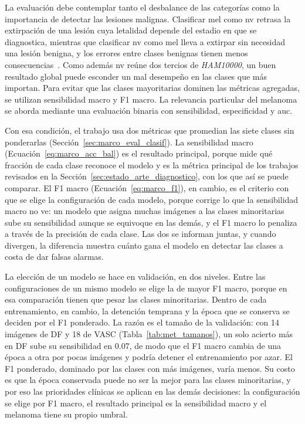 La evaluación debe contemplar tanto el desbalance de las categorías como la importancia de detectar las lesiones malignas. Clasificar \gls{mel} como \gls{nv} retrasa la extirpación de una lesión cuya letalidad depende del estadio en que se diagnostica, mientras que clasificar \gls{nv} como \gls{mel} lleva a extirpar sin necesidad una lesión benigna, y los errores entre clases benignas tienen menos consecuencias~\cite{tschandl2018ham10000,nci2026melanoma}. Como además \gls{nv} reúne dos tercios
de \emph{HAM10000}, un buen resultado global puede esconder un mal desempeño en las clases que más importan. Para evitar que las clases mayoritarias dominen las métricas agregadas, se utilizan sensibilidad macro y F1 macro. La relevancia particular del melanoma se aborda mediante una evaluación binaria con sensibilidad, especificidad y \gls{auc}.

Con esa condición, el trabajo usa dos métricas que promedian las siete clases sin ponderarlas
(Sección~\ref{sec:marco_eval_clasif}). La sensibilidad macro (Ecuación~\ref{eq:marco_acc_bal}) es el resultado
principal, porque mide qué fracción de cada clase reconoce el modelo y es la métrica principal de los trabajos
revisados en la Sección~\ref{sec:estado_arte_diagnostico}, con los que así se puede comparar. El F1 macro
(Ecuación~\ref{eq:marco_f1}), en cambio, es el criterio con que se elige la configuración de cada modelo, porque
corrige lo que la sensibilidad macro no ve: un modelo que asigna muchas imágenes a las clases minoritarias sube su
sensibilidad aunque se equivoque en las demás, y el F1 macro lo penaliza a través de la precisión de cada clase. Las
dos se informan juntas, y cuando divergen, la diferencia muestra cuánto gana el modelo en detectar las clases a costa
de dar falsas alarmas.

La elección de un modelo se hace en validación, en dos niveles. Entre las configuraciones de un mismo modelo se elige
la de mayor F1 macro, porque en esa comparación tienen que pesar las clases minoritarias. Dentro de cada
entrenamiento, en cambio, la detención temprana y la época que se conserva se deciden por el F1 ponderado. La razón
es el tamaño de la validación: con 14 imágenes de DF y 18 de VASC (Tabla~\ref{tab:met_tamanos}), un solo acierto más
en DF sube su sensibilidad en 0.07, de modo que el F1 macro cambia de una época a otra por pocas imágenes y podría
detener el entrenamiento por azar. El F1 ponderado, dominado por las clases con más imágenes, varía menos. Su costo es
que la época conservada puede no ser la mejor para las clases minoritarias, y por eso las prioridades clínicas se
aplican en las demás decisiones: la configuración se elige por F1 macro, el resultado principal es la sensibilidad
macro y el melanoma tiene su propio umbral.

